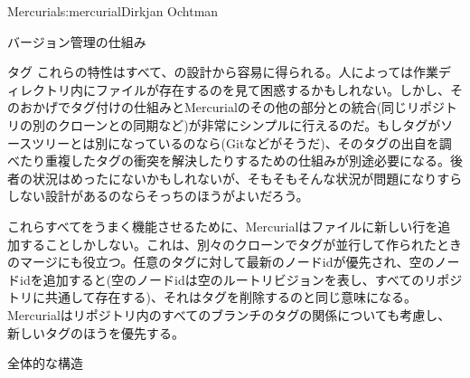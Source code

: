 \begin{aosachapter}{Mercurial}{s:mercurial}{Dirkjan Ochtman}
\begin{aosasect1}{バージョン管理の仕組み}
\begin{aosasect2}{タグ}
これらの特性はすべて、の設計から容易に得られる。人によっては作業ディレクトリ内にファイルが存在するのを見て困惑するかもしれない。しかし、そのおかげでタグ付けの仕組みとMercurialのその他の部分との統合(同じリポジトリの別のクローンとの同期など)が非常にシンプルに行えるのだ。もしタグがソースツリーとは別になっているのなら(Gitなどがそうだ)、そのタグの出自を調べたり重複したタグの衝突を解決したりするための仕組みが別途必要になる。後者の状況はめったにないかもしれないが、そもそもそんな状況が問題になりすらしない設計があるのならそっちのほうがよいだろう。

これらすべてをうまく機能させるために、Mercurialはファイルに新しい行を追加することしかしない。これは、別々のクローンでタグが並行して作られたときのマージにも役立つ。任意のタグに対して最新のノードidが優先され、空のノードidを追加すると(空のノードidは空のルートリビジョンを表し、すべてのリポジトリに共通して存在する)、それはタグを削除するのと同じ意味になる。Mercurialはリポジトリ内のすべてのブランチのタグの関係についても考慮し、新しいタグのほうを優先する。

\end{aosasect2}

\end{aosasect1}

\begin{aosasect1}{全体的な構造}


\end{aosasect1}
\end{aosachapter}
